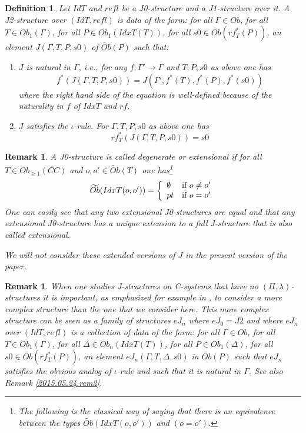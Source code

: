\documentclass[12pt]{article}
\newtheorem{definition}[proposition]{Definition}
\newtheorem{remark}[proposition]{Remark}
\newcommand{\llabel}[1]{\label{#1}}
\newcommand{\sr}{\rightarrow}
\newcommand{\wt}{\widetilde}
\begin{document}
%
\begin{definition}
\llabel{2015.03.27.def3}
Let $IdT$ and $refl$ be a J0-structure and a J1-structure over it. A J2-structure over $(IdT,refl)$ is data of the form: for all $\Gamma\in Ob$, for all $T\in Ob_1(\Gamma)$, for all $P\in Ob_1(IdxT(T))$, for all $s0\in \wt{Ob}(rf_T^*(P))$, an element $J(\Gamma,T,P,s0)$ of $\wt{Ob}(P)$ such that:
%
\begin{enumerate}
\item $J$ is natural in $\Gamma$, i.e., for any $f:\Gamma'\sr \Gamma$ and $T,P,s0$ as above one has
%
$$f^*(J(\Gamma,T,P,s0))=J(\Gamma',f^*(T),f^*(P),f^*(s0))$$
%
where the right hand side of the equation is well-defined because of the naturality in $f$ of $IdxT$ and $rf$. 
\item $J$ satisfies the $\iota$-rule. For $\Gamma, T, P, s0$ as above one has
%
$$rf_T^*(J(\Gamma,T,P,s0))=s0$$
%
\end{enumerate}
\end{definition}
%
\begin{remark}
\llabel{2015.05.12.rem1}\rm
A J0-structure is called degenerate or extensional if for all $T\in Ob_{\ge 1}(CC)$ and $o,o'\in \wt{Ob}(T)$ one has\footnote{The following is the classical way of saying that there is an equivalence between the types $\wt{Ob}(IdxT(o,o'))$ and $(o=o')$.}
%
$$\wt{Ob}(IdxT(o,o'))=\left\{
\begin{array}{ll}
\emptyset&\mbox{\rm if $o\ne o'$}\\
pt&\mbox{\rm if $o=o'$}
\end{array}
\right.
$$
%
One can easily see that any two extensional J0-structures are equal and that any extensional J0-structure has a unique extension to a full J-structure that is also called extensional. 

We will not consider these extended versions of $J$ in the present version of the paper. 
\end{remark}


%
\begin{remark}\rm
\llabel{2015.05.24.rem1}
When one studies J-structures on C-systems that have no $(\Pi,\lambda)$-structures it is important, as emphasized for example in \cite{vandenBergGarner2011}, to consider a more complex structure than the one that we consider here. This more complex structure can be seen as a family of structures $eJ_n$ where $eJ_0=J2$ and where $eJ_n$ over $(IdT,refl)$ is a collection of data of the form: for all $\Gamma\in Ob$, for all $T\in Ob_1(\Gamma)$, for all $\Delta\in Ob_{n}(IdxT(T))$, for all $P\in Ob_1(\Delta)$, for all $s0\in \wt{Ob}(rf_T^*(P))$, an element $eJ_n(\Gamma,T,\Delta,s0)$ in $\wt{Ob}(P)$ such that $eJ_n$ satisfies the obvious analog of $\iota$-rule and such that it is natural in $\Gamma$. See also Remark \ref{2015.05.24.rem2}. 
\end{remark}
\end{document}
